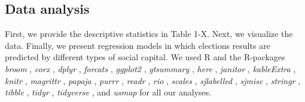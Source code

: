 \documentclass[
  english,
  man]{apa6}
\begin{document}
\hypertarget{data-analysis}{%
\subsection{Data analysis}\label{data-analysis}}

First, we provide the descriptive statistics in Table 1-X. Next, we visualize the data. Finally, we present regression models in which elections results are predicted by different types of social capital.
We used R \autocite[Version 3.6.1;][]{R-base} and the R-packages \emph{broom} \autocite[Version 0.7.0;][]{R-broom}, \emph{corx} \autocite[Version 1.0.6.1;][]{R-corx}, \emph{dplyr} \autocite[Version 1.0.2;][]{R-dplyr}, \emph{forcats} \autocite[Version 0.5.0;][]{R-forcats}, \emph{ggplot2} \autocite[Version 3.3.2;][]{R-ggplot2}, \emph{gtsummary} \autocite[Version 1.3.5;][]{R-gtsummary}, \emph{here} \autocite[Version 0.1;][]{R-here}, \emph{janitor} \autocite[Version 2.0.1;][]{R-janitor}, \emph{kableExtra} \autocite[Version 1.3.1;][]{R-kableExtra}, \emph{knitr} \autocite[Version 1.29;][]{R-knitr}, \emph{magrittr} \autocite[Version 1.5;][]{R-magrittr}, \emph{papaja} \autocite[Version 0.1.0.9997;][]{R-papaja}, \emph{purrr} \autocite[Version 0.3.4;][]{R-purrr}, \emph{readr} \autocite[Version 1.3.1;][]{R-readr}, \emph{rio} \autocite[Version 0.5.16;][]{R-rio}, \emph{scales} \autocite[Version 1.1.1;][]{R-scales}, \emph{sjlabelled} \autocite[Version 1.1.7;][]{R-sjlabelled}, \emph{sjmisc} \autocite[Version 2.8.5;][]{R-sjmisc}, \emph{stringr} \autocite[Version 1.4.0;][]{R-stringr}, \emph{tibble} \autocite[Version 3.0.4;][]{R-tibble}, \emph{tidyr} \autocite[Version 1.1.2;][]{R-tidyr}, \emph{tidyverse} \autocite[Version 1.3.0;][]{R-tidyverse}, and \emph{usmap} \autocite[Version 0.5.1;][]{R-usmap} for all our analyses.
\end{document}
